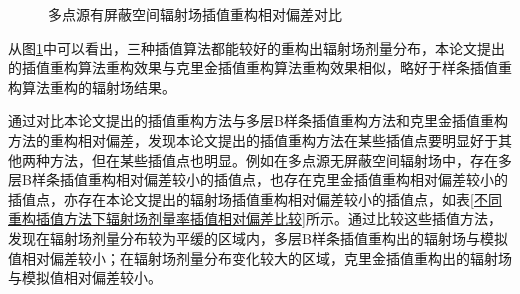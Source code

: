 \begin{figure}[htbp]
    \centering
    \caption{多点源有屏蔽空间辐射场插值重构相对偏差对比}
    \label{多点源有屏蔽空间辐射场插值重构相对偏差对比}
\end{figure}

从图\ref{多点源有屏蔽空间辐射场插值重构相对偏差对比}中可以看出，三种插值算法都能较好的重构出辐射场剂量分布，本论文提出的插值重构算法重构效果与克里金插值重构算法重构效果相似，略好于样条插值重构算法重构的辐射场结果。

通过对比本论文提出的插值重构方法与多层B样条插值重构方法和克里金插值重构方法的重构相对偏差，发现本论文提出的插值重构方法在某些插值点要明显好于其他两种方法，但在某些插值点也明显。例如在多点源无屏蔽空间辐射场中，存在多层B样条插值重构相对偏差较小的插值点，也存在克里金插值重构相对偏差较小的插值点，亦存在本论文提出的辐射场插值重构相对偏差较小的插值点，如表\ref{不同重构插值方法下辐射场剂量率插值相对偏差比较}所示。通过比较这些插值方法，发现在辐射场剂量分布较为平缓的区域内，多层B样条插值重构出的辐射场与模拟值相对偏差较小；在辐射场剂量分布变化较大的区域，克里金插值重构出的辐射场与模拟值相对偏差较小。

